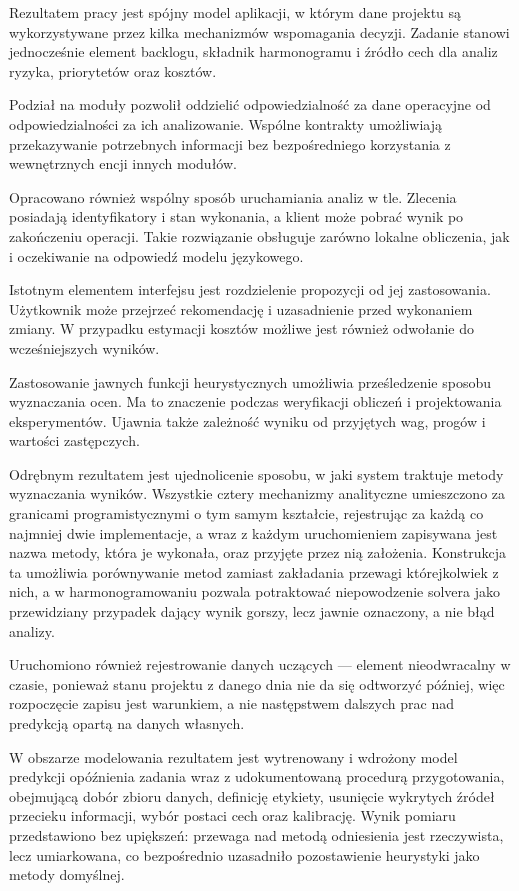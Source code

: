 Rezultatem pracy jest spójny model aplikacji, w którym dane projektu są wykorzystywane przez kilka mechanizmów wspomagania decyzji. Zadanie stanowi jednocześnie element backlogu, składnik harmonogramu i źródło cech dla analiz ryzyka, priorytetów oraz kosztów.

Podział na moduły pozwolił oddzielić odpowiedzialność za dane operacyjne od odpowiedzialności za ich analizowanie. Wspólne kontrakty umożliwiają przekazywanie potrzebnych informacji bez bezpośredniego korzystania z wewnętrznych encji innych modułów.

Opracowano również wspólny sposób uruchamiania analiz w tle. Zlecenia posiadają identyfikatory i stan wykonania, a klient może pobrać wynik po zakończeniu operacji. Takie rozwiązanie obsługuje zarówno lokalne obliczenia, jak i oczekiwanie na odpowiedź modelu językowego.

Istotnym elementem interfejsu jest rozdzielenie propozycji od jej zastosowania. Użytkownik może przejrzeć rekomendację i uzasadnienie przed wykonaniem zmiany. W przypadku estymacji kosztów możliwe jest również odwołanie do wcześniejszych wyników.

Zastosowanie jawnych funkcji heurystycznych umożliwia prześledzenie sposobu wyznaczania ocen. Ma to znaczenie podczas weryfikacji obliczeń i projektowania eksperymentów. Ujawnia także zależność wyniku od przyjętych wag, progów i wartości zastępczych.

Odrębnym rezultatem jest ujednolicenie sposobu, w jaki system traktuje metody wyznaczania wyników. Wszystkie cztery mechanizmy analityczne umieszczono za granicami programistycznymi o tym samym kształcie, rejestrując za każdą co najmniej dwie implementacje, a wraz z każdym uruchomieniem zapisywana jest nazwa metody, która je wykonała, oraz przyjęte przez nią założenia. Konstrukcja ta umożliwia porównywanie metod zamiast zakładania przewagi którejkolwiek z nich, a w harmonogramowaniu pozwala potraktować niepowodzenie solvera jako przewidziany przypadek dający wynik gorszy, lecz jawnie oznaczony, a nie błąd analizy.

Uruchomiono również rejestrowanie danych uczących — element nieodwracalny w czasie, ponieważ stanu projektu z danego dnia nie da się odtworzyć później, więc rozpoczęcie zapisu jest warunkiem, a nie następstwem dalszych prac nad predykcją opartą na danych własnych.

W obszarze modelowania rezultatem jest wytrenowany i wdrożony model predykcji opóźnienia zadania wraz z udokumentowaną procedurą przygotowania, obejmującą dobór zbioru danych, definicję etykiety, usunięcie wykrytych źródeł przecieku informacji, wybór postaci cech oraz kalibrację. Wynik pomiaru przedstawiono bez upiększeń: przewaga nad metodą odniesienia jest rzeczywista, lecz umiarkowana, co bezpośrednio uzasadniło pozostawienie heurystyki jako metody domyślnej.

